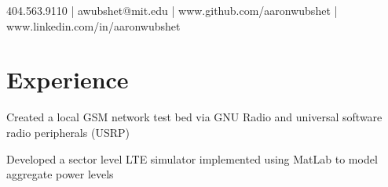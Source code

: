 \documentclass[letterpaper, article]{deedy-resume-openfont}
\begin{document}
%
%


{ 404.563.9110 | awubshet@mit.edu | www.github.com/aaronwubshet | www.linkedin.com/in/aaronwubshet}

%
%
\hfill

\begin{minipage}[t]{0.66\textwidth}
\vspace{.01cm}
\section{Experience}
%
%

\vspace{\topsep} %
\begin{tightemize}
	\item Created a local GSM network test bed via GNU Radio and universal software radio peripherals (USRP)
	\item Developed a sector level LTE simulator implemented using MatLab to model aggregate power levels
\end{tightemize}
\sectionsep


\end{minipage}
\end{document}

